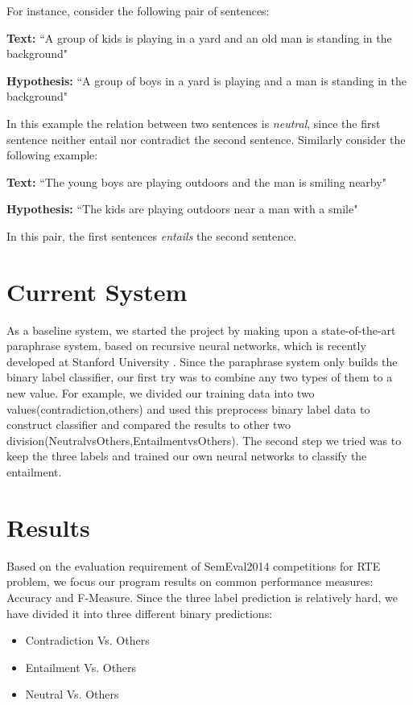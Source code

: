 \documentclass[12pt]{article}
\begin{document}
For instance, consider the following pair of sentences: 
\begin{framed}
\textbf{Text:} ``A group of kids is playing in a yard and an old man is standing in the background"  
 
\textbf{Hypothesis:} ``A group of boys in a yard is playing and a man is standing in the background"
\end{framed}
In this example the relation between two sentences is \textit{neutral}, since the first sentence neither entail nor contradict the second sentence. Similarly consider the following example:
\begin{framed}
\textbf{Text:} ``The young boys are playing outdoors and the man is smiling nearby"  

\textbf{Hypothesis:} ``The kids are playing outdoors near a man with a smile"
\end{framed}
In this pair, the first sentences \textit{entails} the second sentence.
 

\section{Current System}
 
As a baseline system, we started the project by making upon a state-of-the-art paraphrase system, based on recursive neural networks, which is recently developed at Stanford University \cite{socher2011dynamic}. Since the paraphrase system only builds the binary label classifier, our first try was to combine any two types of them to a new value. For example, we divided our training data into two values(contradiction,others) and used this preprocess binary label data to construct classifier and compared the results to other two division(NeutralvsOthers,EntailmentvsOthers). The second step we tried was to keep the three labels and trained our own neural networks to classify the entailment. 


\section{Results}
Based on the evaluation requirement of SemEval2014 competitions for RTE problem, we focus our program results on common performance measures: Accuracy and F-Measure. Since the three label prediction is relatively hard, we have divided it into three different binary predictions: 

\begin{itemize}
\item Contradiction Vs. Others 
\item Entailment Vs. Others 
\item Neutral Vs. Others 
\end{itemize}
\end{document}

